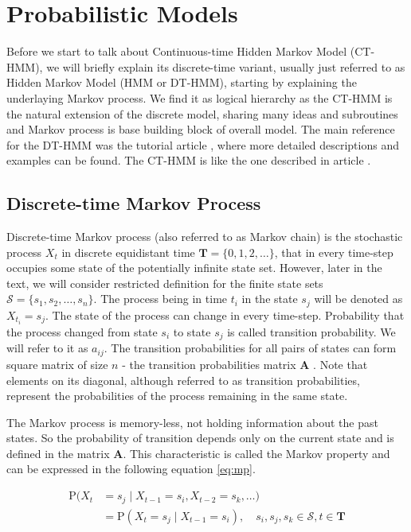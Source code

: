 \documentclass[thesis=M,english]{FITthesis}[2012/10/20]
\newcommand{\matr}[1]{\mathbf{#1}}
\begin{document}

\chapter{Probabilistic Models}\label{ch:pm}

Before we start to talk about Continuous-time Hidden Markov Model (CT-HMM), we will briefly explain its discrete-time variant, usually just referred to as Hidden Markov Model (HMM or DT-HMM), starting by explaining the underlaying Markov process. We find it as logical hierarchy as the CT-HMM is the natural extension of the discrete model, sharing many ideas and subroutines and Markov process is base building block of overall model. The main reference for the DT-HMM was the tutorial article \cite{Ra89}, where more detailed descriptions and examples can be found. The CT-HMM is like the one described in article \cite{Li15}.

\section{Discrete-time Markov Process}\label{sec:DMP}
    
Discrete-time Markov process (also referred to as Markov chain) \cite{TODO} is the stochastic process $X_t$ in discrete equidistant time $\matr{T} = \{ 0, 1, 2, \dots \}$, that in every time-step occupies some state of the potentially infinite state set. However, later in the text, we will consider restricted definition for the finite state sets $\mathcal{S} = \{ s_1, s_2, \dots, s_n\}$.  The process being in time $t_i$ in the state $s_j$ will be denoted as $X_{t_i} = s_j$. The state of the process can change in every time-step. Probability that the process changed from state $s_i$ to state $s_j$ is called transition probability. We will refer to it as $a_{ij}$. The transition probabilities for all pairs of states can form square matrix of size $n$ - the transition probabilities matrix $\matr{A}$ . Note that elements on its diagonal, although referred to as transition probabilities, represent the probabilities of the process remaining in the same state.

The Markov process is memory-less, not holding information about the past states. So the probability of transition depends only on the current state and is defined in the matrix $\matr{A}$. This characteristic is called the Markov property and can be expressed in the following equation \eqref{eq:mp}.

\begin{equation}\label{eq:mp}
\begin{aligned}
\mathrm{P}(X_t & = s_j \mid X_{t-1} = s_i, X_{t-2} = s_k, \dots)  \\   
               & = \mathrm{P}(X_t = s_j \mid X_{t-1} = s_i ), \quad s_i,s_j,s_k \in \mathcal{S}, t \in \matr{T}
\end{aligned}
\end{equation}
\end{document}
